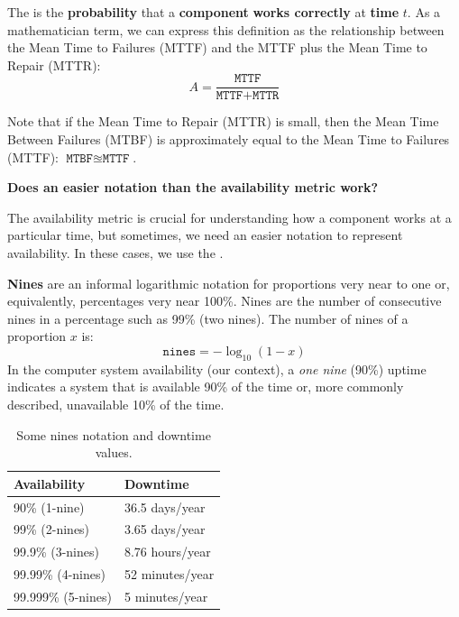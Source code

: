 \begin{definitionbox}
    The  is the \textbf{probability} that a \textbf{component} \textbf{works correctly} at \textbf{time} $t$. As a mathematician term, we can express this definition as the relationship between the Mean Time to Failures (MTTF) and the MTTF plus the Mean Time to Repair (MTTR):
    \begin{equation}\label{eq: availability metric}
        A = \dfrac{
            \texttt{MTTF}
        }{
            \texttt{MTTF} + \texttt{MTTR}
        }
    \end{equation}
\end{definitionbox}

\noindent
Note that if the Mean Time to Repair (MTTR) is small, then the Mean Time Between Failures (MTBF) is approximately equal to the Mean Time to Failures (MTTF): $\texttt{MTBF} \approxeq \texttt{MTTF}$.

\begin{flushleft}
    \textcolor{Green3}{ \textbf{Does an easier notation than the availability metric work?}}
\end{flushleft}
The availability metric is crucial for understanding how a component works at a particular time, but sometimes, we need an easier notation to represent availability. In these cases, we use the .

\highspace
\textbf{Nines} are an informal logarithmic notation for proportions very near to one or, equivalently, percentages very near 100\%. Nines are the number of consecutive nines in a percentage such as 99\% (two nines). The number of nines of a proportion $x$ is:
\begin{equation}\label{eq: nines}
    \texttt{nines} = - \log_{10} \left(1-x\right)
\end{equation}
In the computer system availability (our context), a \emph{one nine} (90\%) uptime indicates a system that is available 90\% of the time or, more commonly described, unavailable 10\% of the time.
\begin{table}[!htp]
    \centering
    \begin{tabular}{@{} l l @{}}
        \toprule
        \textbf{Availability} & \textbf{Downtime} \\
        \toprule
        90\% (1-nine)       & 36.5 days/year \\
        99\% (2-nines)      & 3.65 days/year \\
        99.9\% (3-nines)    & 8.76 hours/year \\
        99.99\% (4-nines)   & 52 minutes/year \\
        99.999\% (5-nines)  & 5 minutes/year \\
        \bottomrule
    \end{tabular}
    \caption{Some nines notation and downtime values.}
\end{table}

